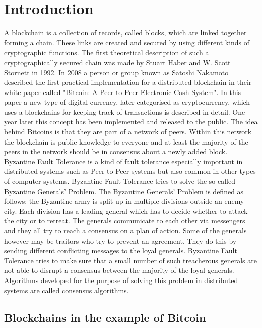 \section{Introduction}

A blockchain is a collection of records, called blocks, which are linked together forming a chain. These links are created and secured by using different kinds of cryptographic functions.
The first theoretical description of such a cryptographically secured chain was made by Stuart Haber and W. Scott Stornett in 1992.\cite{book:haber} In 2008 a person or group known as Satoshi Nakamoto
described the first practical implementation for a distributed blockchain in their white paper called "Bitcoin: A Peer-to-Peer Electronic Cash System".\cite{url:bitcoin} In this paper a new type of digital
currency, later categorised as cryptocurrency, which uses a blockchains for keeping track of transactions is described in detail. One year later this concept has been implemented and released to the
public. The idea behind Bitcoins is that they are part of a network of peers. Within this network the blockchain is public knowledge to everyone and at least the majority of the peers in the
network should be in consensus about a newly added block.\\

Byzantine Fault Tolerance is a kind of fault tolerance especially important in distributed systems such as Peer-to-Peer systems but also common in other types of computer systems.
Byzantine Fault Tolerance tries to solve the so called Byzantine Generals' Problem. The Byzantine Generals' Problem is defined as follows: the Byzantine army is split up in multiple divisions 
outside an enemy city. Each division has a leading general which has to decide whether to attack the city or to retreat. The generals communicate to each other via messengers and they all try to
reach a consensus on a plan of action. Some of the generals however may be traitors who try to prevent an agreement. They do this by sending different conflicting messages to the loyal generals. 
Byzantine Fault Tolerance tries to make sure that a small number of such treacherous generals are not able to disrupt a consensus between the majority of the loyal generals.\cite{url:byzantine_general}
Algorithms developed for the purpose of solving this problem in distributed systems are called consensus algorithms.

\subsection{Blockchains in the example of Bitcoin}

